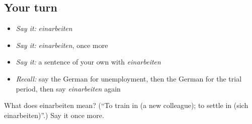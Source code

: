 \subsection*{Your turn}
\begin{itemize}
\raggedright
  \item \emph{Say it:} \emph{einarbeiten}
  \item \emph{Say it:} \emph{einarbeiten}, once more
  \item \emph{Say it:} a sentence of your own with \emph{einarbeiten}
  \item \emph{Recall:} say the German for unemployment, then the German for the trial period, then say \emph{einarbeiten} again
\end{itemize}

\begin{tcolorbox}[breakable,colback=teal!4,colframe=teal!35!black,title={Before you move on}]
What does einarbeiten mean? (\textquotedblleft{}To train in (a new colleague); to settle in (sich einarbeiten)\textquotedblright{}.) Say it once more.
\end{tcolorbox}
